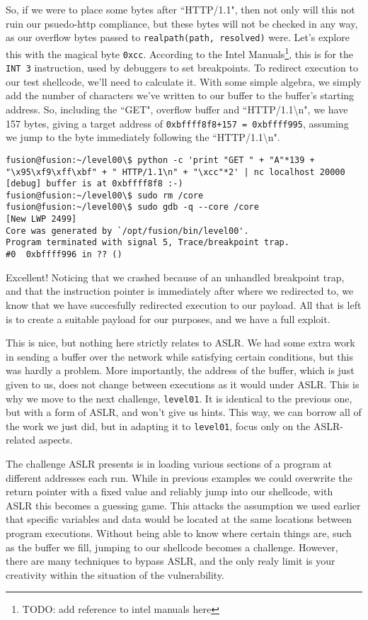 So, if we were to place some bytes after ``HTTP/1.1", then not only
will this not ruin our psuedo-http compliance, but these bytes will
not be checked in any way, as our overflow bytes passed to \texttt{realpath(path, resolved)} were.
Let's explore this with the magical byte \texttt{0xcc}. According to
the Intel Manuals\footnote{TODO: add reference to intel manuals here}, this
is for the \texttt{INT 3} instruction, used by debuggers to set breakpoints.
To redirect execution to our test shellcode, we'll need to calculate it.
With some simple algebra, we simply add the number of characters
we've written to our buffer to the buffer's starting address. So, 
including the ``GET", overflow buffer and ``HTTP/1.1\textbackslash n", we have 157
bytes, giving a target address of \texttt{0xbffff8f8+157 = 0xbffff995},
assuming we jump to the byte immediately following the ``HTTP/1.1\textbackslash n".

\begin{lstlisting}
fusion@fusion:~/level00\$ python -c 'print "GET " + "A"*139 + "\x95\xf9\xff\xbf" + " HTTP/1.1\n" + "\xcc"*2' | nc localhost 20000
[debug] buffer is at 0xbffff8f8 :-)
fusion@fusion:~/level00\$ sudo rm /core
fusion@fusion:~/level00\$ sudo gdb -q --core /core
[New LWP 2499]
Core was generated by `/opt/fusion/bin/level00'.
Program terminated with signal 5, Trace/breakpoint trap.
#0  0xbffff996 in ?? ()
\end{lstlisting}

Excellent! Noticing that we crashed because of an unhandled
breakpoint trap, and that the instruction pointer is immediately
after where we redirected to, we know that we have succesfully
redirected execution to our payload. All that is left is to
create a suitable payload for our purposes, and we have
a full exploit. 

This is nice, but nothing here strictly relates to ASLR. We
had some extra work in sending a buffer over the network while satisfying
certain conditions, but this was hardly a problem. More 
importantly, the address of the buffer, which is just given
to us, does not change between executions as it would under ASLR.
This is why we move to the next challenge, \texttt{level01}. 
It is identical to the previous one, but with a form of ASLR, and 
won't give us hints. This way, we can borrow all of the work
we just did, but in adapting it to \texttt{level01}, focus
only on the ASLR-related aspects.

The challenge ASLR presents is in loading various sections of a 
program at different addresses each run. While in previous examples
we could overwrite the return pointer with a fixed value and reliably
jump into our shellcode, with ASLR this becomes a guessing game.
This attacks the assumption we used earlier that specific variables
and data would be located at the same locations between program
executions. Without being able to know where certain things are, 
such as the buffer we fill, jumping to our shellcode becomes a
challenge. However, there are many techniques to bypass
ASLR, and the only realy limit is your creativity within the
situation of the vulnerability.

